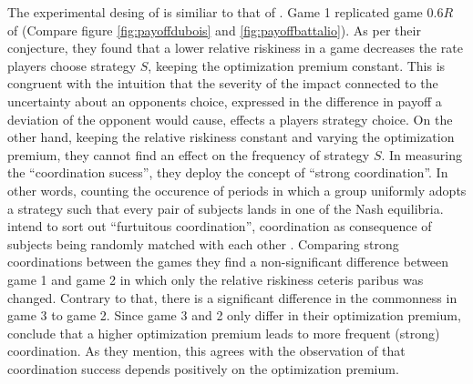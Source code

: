 The experimental desing of \textcite{dubois_optimization_2012} is similiar
to that of \textcite{battalio_optimization_2001}.
Game 1 replicated game $0.6R$  of \textcite{battalio_optimization_2001}  
(Compare figure \ref{fig:payoffdubois} and \ref{fig:payoffbattalio}). 
As per their conjecture, they found that a lower relative riskiness 
in a game decreases the rate players choose strategy $S$, 
keeping the optimization premium constant. This is congruent with 
the intuition that the severity of the impact connected to the uncertainty
about an opponents choice, expressed in
the difference in payoff a deviation of the opponent would cause,
effects a players strategy choice. 
On the other hand, keeping the relative riskiness constant and varying the
optimization premium, they cannot find an effect on the frequency of 
strategy $S$. 
In measuring the ``coordination sucess'', they deploy the concept of ``strong
coordination''. 
In other words, counting the occurence of periods in which a group
uniformly adopts a strategy such that every pair of subjects lands in one
of the Nash equilibria. \textcite{dubois_optimization_2012} intend to sort 
out ``furtuitous coordination'', coordination as consequence of subjects being
randomly matched with each other \parencite[373]{dubois_optimization_2012}.
Comparing strong coordinations between the games they find a non-significant 
difference between game 1 and game 2 in which only the relative riskiness 
ceteris paribus was changed. Contrary to that, there is a significant 
difference in the commonness in game 3 to game 2.
Since game 3 and 2 only differ in their optimization premium, 
\textcite{dubois_optimization_2012} conclude that a higher optimization
premium leads to more frequent (strong) coordination. 
As they mention, this agrees with the observation of 
\textcite{battalio_optimization_2001} that coordination success depends 
positively on the optimization premium. 

